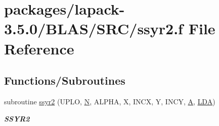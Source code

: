 \hypertarget{lapack-3_85_80_2BLAS_2SRC_2ssyr2_8f}{}\section{packages/lapack-\/3.5.0/\+B\+L\+A\+S/\+S\+R\+C/ssyr2.f File Reference}
\label{lapack-3_85_80_2BLAS_2SRC_2ssyr2_8f}
\subsection*{Functions/\+Subroutines}
\begin{DoxyCompactItemize}
\item 
subroutine \hyperlink{group__single__blas__level2_gafeb94d36b0bb94a6f87a0576e339434d}{ssyr2} (U\+P\+L\+O, \hyperlink{polmisc_8c_a0240ac851181b84ac374872dc5434ee4}{N}, A\+L\+P\+H\+A, X, I\+N\+C\+X, Y, I\+N\+C\+Y, \hyperlink{classA}{A}, \hyperlink{example__user_8c_ae946da542ce0db94dced19b2ecefd1aa}{L\+D\+A})
\begin{DoxyCompactList}\small\item\em {\bfseries S\+S\+Y\+R2} \end{DoxyCompactList}\end{DoxyCompactItemize}
